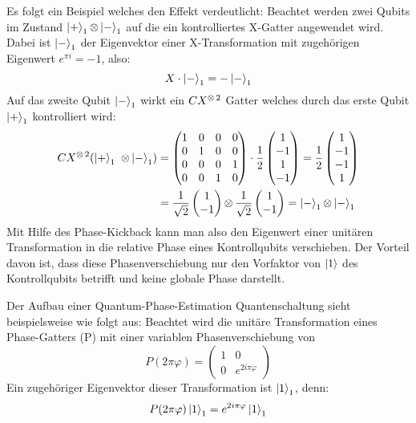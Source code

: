Es folgt ein Beispiel welches den Effekt verdeutlicht:
Beachtet werden zwei Qubits im Zustand \(\ket{+}_1 \operatorname{\otimes} \ket{-}_1\) auf die ein kontrolliertes X-Gatter angewendet wird.
Dabei ist \(\ket{-}_1\) der Eigenvektor einer X-Transformation mit zugehörigen Eigenwert \(e^{\pi i} = -1\), also: 
\[X \cdot \ket{-}_1=-\ket{-}_1\]
Auf das zweite Qubit \(\ket{-}_1\) wirkt ein \(CX^{\operatorname{\otimes} 2}\) Gatter welches durch das erste Qubit \(\ket{+}_1\) kontrolliert wird:
\begin{align*}
  CX^{\operatorname{\otimes} 2}( \ket{+}_1\ \operatorname{\otimes} \ket{-}_1) &=
  \begin{pmatrix}
    1 & 0 & 0 & 0\\
    0 & 1 & 0 & 0\\
    0 & 0 & 0 & 1\\
    0 & 0 & 1 & 0
  \end{pmatrix}
  \cdot
  \frac{1}{{2}}
  \begin{pmatrix}
    1 \\
    -1 \\
    1 \\
    -1 
  \end{pmatrix}
  =
  \frac{1}{{2}}
  \begin{pmatrix}
    1 \\
    -1 \\
    -1 \\
    1 
  \end{pmatrix} \\
  &=
  \frac{1}{{\sqrt{2}}}
  \begin{pmatrix}
    1 \\
    -1 
  \end{pmatrix}
  \operatorname{\otimes}
  \frac{1}{{\sqrt{2}}}
  \begin{pmatrix}
    1 \\
    -1 
  \end{pmatrix}
  =
  \ket{-}_1 \operatorname{\otimes} \ket{-}_1
  \end{align*}
Mit Hilfe des Phase-Kickback kann man also den Eigenwert einer unitären Transformation in die relative Phase eines Kontrollqubits verschieben.
Der Vorteil davon ist, 
dass diese Phasenverschiebung nur den Vorfaktor von \(\ket{1}\) des Kontrollqubits betrifft und keine globale Phase darstellt.

Der Aufbau einer Quantum-Phase-Estimation Quantenschaltung sieht beispielsweise wie folgt aus:
Beachtet wird die unitäre Transformation eines Phase-Gatters (P) mit einer variablen Phasenverschiebung von 
\[P(2 \pi \varphi ) = 
\begin{pmatrix}
  1 & 0\\
  0 & e^{2 i \pi \varphi}
\end{pmatrix}\]
Ein zugehöriger Eigenvektor dieser Transformation ist \(\ket{1}_1\), 
denn: 
\[P(2 \pi \varphi)\ket{1}_1 = e^{2 i \pi \varphi} \ket{1}_1\]

